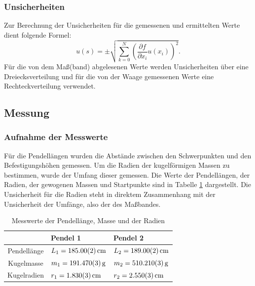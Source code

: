 		\subsubsection{Unsicherheiten}
		
			Zur Berechnung der Unsicherheiten für die gemessenen und ermittelten Werte dient folgende Formel: 
			\begin{equation*}
				u(s) = \pm \sqrt{\sum_{k=0}^{N}\left( \frac{\partial f}{\partial x_i}u(x_i)\right) ^2}. \label{eq:kombUnsicherheit}
			\end{equation*}
			Für die von dem Maß(band) abgelesenen Werte werden Unsicherheiten über eine Dreiecksverteilung und für die von der Waage gemessenen Werte eine Rechteckverteilung verwendet. 
	
	\subsection{Messung}
	
		\subsubsection{Aufnahme der Messwerte}
		
			Für die Pendellängen wurden die Abstände zwischen den Schwerpunkten und den Befestigungshöhen gemessen. 
			Um die Radien der kugelförmigen Massen zu bestimmen, wurde der Umfang dieser gemessen. Die Werte der Pendellängen, der Radien, der gewogenen Massen und Startpunkte sind in Tabelle \ref{tab:Messwerte} dargestellt. Die Unsicherheit für die Radien steht in direktem Zusammenhang mit der Unsicherheit der Umfänge, also der des Maßbandes.
			\begin{table}[ht]
				\caption{Messwerte der Pendellänge, Masse und der Radien}
				\centering
				\label{tab:Messwerte}
				\begin{tabular}{c|l|l}
					{} & {Pendel 1} & {Pendel 2}	\\
					\hline
					{Pendellänge} & {$L_1 = \SI{185+-0,02}{\cm}$} & {$L_2 = \SI{189+-0,02}{\cm}$}	\\
					\hline
					{Kugelmasse} & {$m_1 = \SI{191,47+-0,003}{\g}$} & {$m_2 = \SI{510,21+-0,003}{\g}$}	\\	
					\hline
					{Kugelradien} & {$r_1 = \SI{1,83+-0,003}{\cm}$} & {$r_2 = \SI{2,55+-0,003}{\cm}$}	\\			
				\end{tabular}
			\end{table}
			
